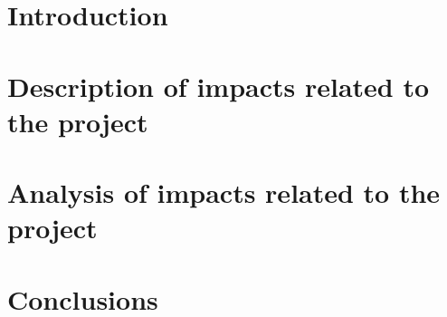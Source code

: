 \documentclass[../main.tex]{subfiles}
\begin{document}
\section{Introduction}

\section{Description of impacts related to the project}

\section{Analysis of impacts related to the project}

\section{Conclusions}

\end{document}
